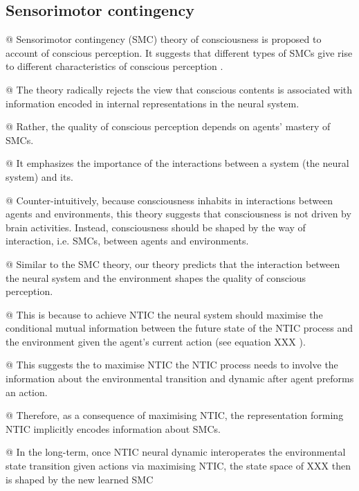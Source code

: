 \documentclass[utf8]{article}
\newenvironment{ants}
			{
			 \begin{easylist}[itemize]		
		 	}
			{
			\end{easylist}
			}
\begin{document}
		\subsection{Sensorimotor contingency}
			\begin{ants}
				
				@ Sensorimotor contingency (SMC) theory of consciousness is proposed to account of conscious perception. It suggests that different types of SMCs give rise to different characteristics of conscious perception \cite{o2001sensorimotor}. 
				
				@ The theory radically rejects the view that conscious contents is associated with information encoded in internal representations in the neural system. 

				@ Rather, the quality of conscious perception depends on agents' mastery of SMCs. 
				
				@ It emphasizes the importance of the interactions between a system (the neural system) and its. 
				
				@ Counter-intuitively, because consciousness inhabits in interactions between agents and environments, this theory suggests that consciousness is not driven by brain activities. Instead, consciousness should be shaped by the way of interaction, i.e. SMCs, between agents and environments. 
														

				
				
				@ Similar to the SMC theory, our theory predicts that the interaction between the neural system and the environment shapes the quality of conscious perception. 
				
				@ This is because to achieve NTIC the neural system should maximise the conditional mutual information between the future state of the NTIC process and the environment given the agent's current action (see equation XXX ).
				
				@ This suggests the to maximise NTIC the NTIC process needs to involve the information about the environmental transition and dynamic after agent preforms an action. 
				
				
				@ Therefore, as a consequence of maximising NTIC, the representation forming NTIC implicitly encodes information about SMCs. 
				
				@ In the long-term, once NTIC neural dynamic interoperates the environmental state transition given actions via maximising NTIC, the state space of XXX then is shaped by the new learned SMC
				

\end{ants}
\end{document}
